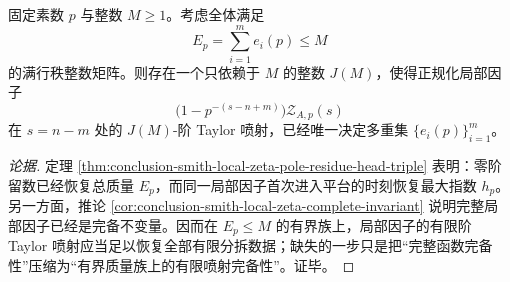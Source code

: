 \begin{conjecture}\label{conj:conclusion-smith-bounded-total-loss-local-zeta-jet-determinacy}
固定素数 \(p\) 与整数 \(M\ge 1\)。考虑全体满足
\[
E_p=\sum_{i=1}^{m}e_i(p)\le M
\]
的满行秩整数矩阵。则存在一个只依赖于 \(M\) 的整数 \(J(M)\)，使得正规化局部因子
\[
\bigl(1-p^{-(s-n+m)}\bigr)\mathcal Z_{A,p}(s)
\]
在 \(s=n-m\) 处的 \(J(M)\)-阶 Taylor 喷射，已经唯一决定多重集 \(\{e_i(p)\}_{i=1}^{m}\)。
\end{conjecture}
\begin{proof}[论据]
定理 \ref{thm:conclusion-smith-local-zeta-pole-residue-head-triple} 表明：零阶留数已经恢复总质量 \(E_p\)，而同一局部因子首次进入平台的时刻恢复最大指数 \(h_p\)。另一方面，推论 \ref{cor:conclusion-smith-local-zeta-complete-invariant} 说明完整局部因子已经是完备不变量。因而在 \(E_p\le M\) 的有界族上，局部因子的有限阶 Taylor 喷射应当足以恢复全部有限分拆数据；缺失的一步只是把“完整函数完备性”压缩为“有界质量族上的有限喷射完备性”。证毕。
\end{proof}
